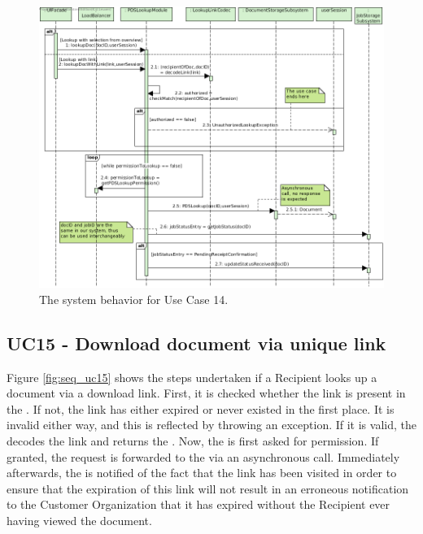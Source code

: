 \begin{figure}[!htp]
    \centering
    \includegraphics[width=\textwidth]{figures/UC14 - Consult document in PDS.png}
    \caption{The system behavior for Use Case 14.
        }\label{fig:seq_uc14}
\end{figure}

\subsection{UC15 - Download document via unique link}
Figure \ref{fig:seq_uc15} shows the steps undertaken if a Recipient looks up a document via a download link. First, it is checked whether the link is present in the . If not, the link has either expired or never existed in the first place. It is invalid either way, and this is reflected by throwing an exception. If it is valid, the  decodes the link and returns the . Now, the  is first asked for permission. If granted, the request is forwarded to the  via an asynchronous call. Immediately afterwards, the  is notified of the fact that the link has been visited in order to ensure that the expiration of this link will not result in an erroneous notification to the Customer Organization that it has expired without the Recipient ever having viewed the document.

